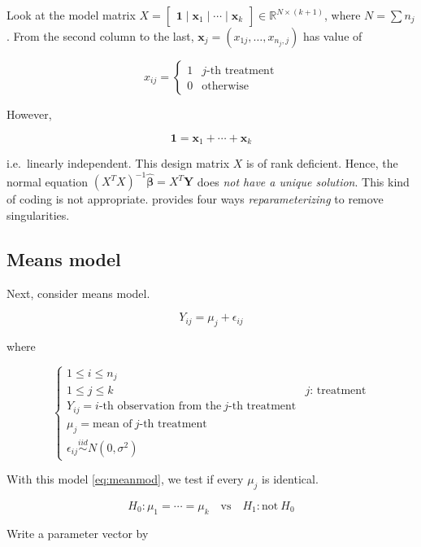 \documentclass[]{book}
\theoremstyle{definition}
\theoremstyle{definition}
\theoremstyle{definition}
\theoremstyle{remark}
\begin{document}
Look at the model matrix \(X = \begin{bmatrix} \mathbf{1} \mid \mathbf{x}_1 \mid \cdots \mid \mathbf{x}_k \end{bmatrix} \in \mathbb{R}^{N \times (k + 1)}\), where \(N = \sum n_j\). From the second column to the last, \(\mathbf{x}_j = (x_{1j}, \ldots, x_{n_j, j})\) has value of

\[
x_{ij} = \begin{cases}
  1 & j\text{-th treatment} \\
  0 & \text{otherwise}
\end{cases}
\]

However,

\[\mathbf{1} = \mathbf{x}_1 + \cdots + \mathbf{x}_k\]

i.e.~linearly independent. This design matrix \(X\) is of rank deficient. Hence, the normal equation \((X^TX)^{-1}\boldsymbol{\hat\beta}= X^T \mathbf{Y}\) does \emph{not have a unique solution}. This kind of coding is not appropriate. \citet{Rawlings:2006aa} provides four ways \emph{reparameterizing} to remove singularities.

\hypertarget{means-model}{%
\subsection{Means model}\label{means-model}}

Next, consider means model.

\begin{equation}
  Y_{ij} = \mu_j + \epsilon_{ij}
  \label{eq:meanmod}
\end{equation}

where

\[
\begin{cases}
  1 \le i \le n_j \\
  1 \le j \le k & j \text{: treatment} \\
  Y_{ij} = i \text{-th observation from the}\: j \text{-th treatment} \\
  \mu_j = \text{mean of}\: j \text{-th treatment} \\
  \epsilon_{ij} \stackrel{iid}{\sim}N(0, \sigma^2)
\end{cases}
\]

With this model \eqref{eq:meanmod}, we test if every \(\mu_j\) is identical.

\[H_0: \mu_1 = \cdots = \mu_k \quad \text{vs} \quad H_1: \text{not}\: H_0\]

Write a parameter vector by
\end{document}
